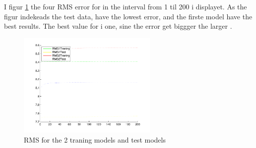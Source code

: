 I figur \ref{fig:q2} the four RMS error for \alpha in the interval from
1 til 200 i displayet. As the figur indekeads the test data, have the
lowest error, and the firste model have the best results. The best value
for \alpha i one, sine the error get biggger the larger \alpha.

\begin{figure}[!htbp]
  \centering
  \includegraphics[width=0.6\textwidth]{./images/Q2.pdf}
  \caption{RMS for the 2 traning models and test models}
  \label{fig:q2}
\end{figure}

